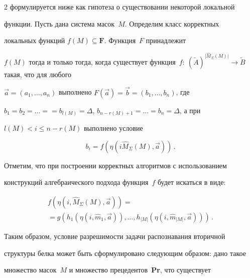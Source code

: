 \begin{multicols}{2}
формулируется ниже как гипотеза о существовании некоторой локальной 

функции. Пусть дана система масок~$M$. Определим класс корректных 

локальных функций $f(M)\subseteq \mathbf{F}$. Функция~$F$ принадлежит 

$f(M)$ тогда и только тогда, когда существует функция~$f:\ \left(\tilde{A}\right) 

^{\vert \hat{M}_\Sigma(M)\vert} \rightarrow \tilde{B}$ такая, что для любого 

$\vec{a}=(a_1, \ldots ,a_n)$ выполнено $F(\vec{a})=\vec{b}=(b_1, \ldots , b_n)$, где 

$b_1=b_2=\ldots =$\linebreak $= b_{l(M)}=\Delta$, $b_{n-r(M)+1}=\ldots = b_n=\Delta$, а при 

$l(M)<i\leq n-r(M)$ выполнено условие

\begin{equation}

b_i  =f\left(\eta\left( i \hat{M}_\Sigma(M),\vec{a}\right)\right)\,.

\label{e5tor}

\end{equation}



Отметим, что при построении корректных алгоритмов с использованием 

конструкций алгебраического подхода функция~$f$ будет искаться в виде:

\begin{multline*}

f\left(\eta \left(i, \hat{M}_\Sigma (M),\vec{a}\right)\right) ={}

\\

{}=

g\left( h_1\left(\eta \left(i, \hat{m}_1,\vec{a}\right)\right), \ldots , h_{\vert M\vert} 

\left( \eta\left (i, \hat{m}_{\vert M\vert}, \vec{a}\right)\right)\right)\,.


\end{multline*}



Таким образом, условие разрешимости задачи распознавания вторичной 

структуры белка может быть сформулировано следующим образом: дано такое 

множество масок~$M$ и множество прецедентов~\textbf{Pr}, что существует 


\end{multicols}

